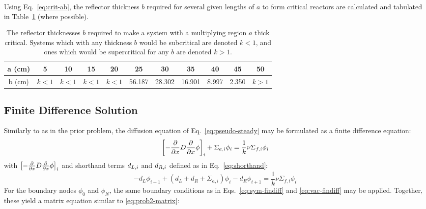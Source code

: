 \documentclass[12pt]{article}
\begin{document}
Using Eq.~\ref{eq:crit-ab}, the reflector thickness $b$ required for several given lengths of $a$ to form critical reactors are calculated and tabulated in Table~\ref{tab:bvals} (where possible).

\begin{table}
    \label{tab:bvals}
    \caption{The reflector thicknesses $b$ required to make a system with a multiplying region $a$ thick critical. Systems which with any thickness $b$ would be subcritical are denoted $k<1$, and ones which would be supercritical for any $b$ are denoted $k>1$.}
    \begin{tabular}{c|cccccccccc}
a (cm) & 5 & 10 & 15 & 20 & 25 & 30 & 35 & 40 & 45 & 50\\\hline
b (cm) & $k<1$ & $k<1$ & $k<1$ & $k<1$ & 56.187 & 28.302 & 16.901 & 8.997 & 2.350 & $k>1$
    \end{tabular}
\end{table}
\FloatBarrier
\subsection{Finite Difference Solution}
Similarly to as in the prior problem, the diffusion equation of Eq.~\ref{eq:pseudo-steady} may be formulated as a finite difference equation:
\begin{equation}
    \label{eq:mult-findiff}
    \left[-\frac{\partial}{\partial x} D\frac{\partial}{\partial x}\phi\right]_i + \Sigma_{a,i}\phi_i = \frac{1}{k}\nu\Sigma_{f,i}\phi_i
\end{equation}
with $\left[-\frac{\partial}{\partial x} D\frac{\partial}{\partial x}\phi\right]_i$ and shorthand terms $d_{L,i}$ and $d_{R,i}$ defined as in Eq.~\ref{eq:shorthand}:
\begin{equation}
    \label{eq:mult-findiff}
    -d_L\phi_{i-1} + \left(d_L+d_R+\Sigma_{a,i}\right)\phi_i - d_R\phi_{i+1} = \frac{1}{k}\nu\Sigma_{f,i}\phi_i
\end{equation}
For the boundary nodes $\phi_0$ and $\phi_N$, the same boundary conditions as in Eqs.~\ref{eq:sym-findiff} and \ref{eq:vac-findiff} may be applied.
Together, these yield a matrix equation similar to \ref{eq:prob2-matrix}:
\end{document}
